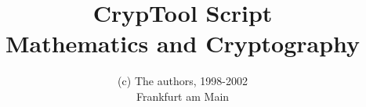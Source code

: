 \documentclass[a4paper,11pt]{article}
\title{ CrypTool Script \\ Mathematics and Cryptography }
\author{
(c) The authors, 1998-2002 \\
Frankfurt am Main
}
\begin{document}
\pagestyle{plain}
\setlength{\fboxrule}{.5mm}
\setlength{\fboxsep}{1.75mm}
\setlength{\footnotesep}{6pt}
\addtolength{\footskip}{8pt}

\renewcommand\footnoterule{%
  \vspace{2em}%
  \hrule width .4\columnwidth
 \vspace{4pt}
}


\maketitle
\end{document}
